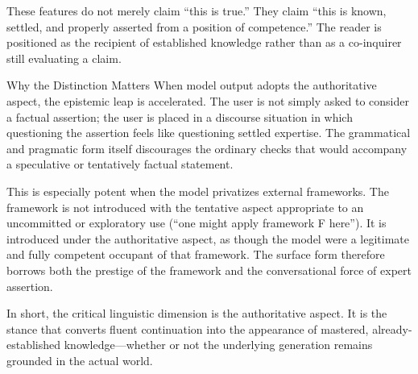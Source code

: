 These features do not merely claim “this is true.” They claim “this is known, settled, and properly asserted from a position of competence.” The reader is positioned as the recipient of established knowledge rather than as a co-inquirer still evaluating a claim.

Why the Distinction Matters
When model output adopts the authoritative aspect, the epistemic leap is accelerated. The user is not simply asked to consider a factual assertion; the user is placed in a discourse situation in which questioning the assertion feels like questioning settled expertise. The grammatical and pragmatic form itself discourages the ordinary checks that would accompany a speculative or tentatively factual statement.

This is especially potent when the model privatizes external frameworks. The framework is not introduced with the tentative aspect appropriate to an uncommitted or exploratory use (“one might apply framework F here”). It is introduced under the authoritative aspect, as though the model were a legitimate and fully competent occupant of that framework. The surface form therefore borrows both the prestige of the framework and the conversational force of expert assertion.

In short, the critical linguistic dimension is the authoritative aspect. It is the stance that converts fluent continuation into the appearance of mastered, already-established knowledge—whether or not the underlying generation remains grounded in the actual world.
